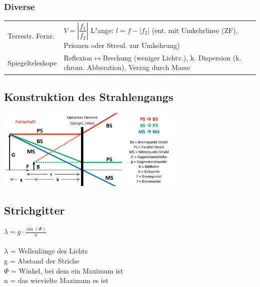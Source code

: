 \subsubsection{Diverse  }
\begin{tabular}{ll}
  Terrestr. Fernr. & 
  $V=\left|\dfrac{f_1}{f_2}\right|$ \qquad L"ange: $l=f-|f_2|$ (ent. mit
  Umkehrlinse (ZF), Prismen oder Streul. zur Umkehrung) \\
  Spiegelteleskope &
  Reflexion$\leftrightarrow$Brechung (weniger Lichtv.), k. Dispersion (k. chrom.
  Abberation), Verzug durch Masse  \\
\end{tabular}
\begin{multicols}{2}

\subsection{Konstruktion des Strahlengangs}
\begin{center}
  \includegraphics[width=9cm]{./bilder/strahlengang.png}
\end{center}

\subsection{Strichgitter}
$\lambda = g \cdot \frac{\sin(\Phi)}{n}$\\
\\
$\lambda$ = Wellenlänge des Lichts\\
g = Abstand der Striche\\
$\Phi$ = Winkel, bei dem ein Maximum ist\\
n = das wievielte Maximum es ist\\
\end{multicols}